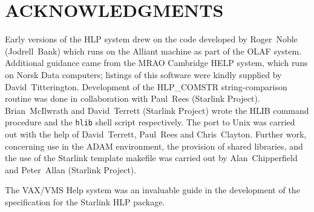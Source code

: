 \documentclass[11pt,nolof]{starlink}
\begin{document}
\section{ACKNOWLEDGMENTS}
Early versions of the HLP system drew on the code developed by
Roger~Noble (Jodrell~Bank) which runs on the Alliant machine as part of
the OLAF system.  Additional guidance came from the MRAO Cambridge HELP
system, which runs on Norsk Data computers;  listings of this software
were kindly supplied by David~Titterington.  Development of the
HLP\_COMSTR string-comparison routine was done in collaboration with
Paul~Rees (Starlink Project).  Brian~McIlwrath and David~Terrett
(Starlink Project) wrote the HLIB command procedure and the \texttt{hlib}
shell script respectively.  The port to Unix was carried out
with the help of David~Terrett, Paul~Rees and Chris~Clayton.  Further
work, concerning use in the ADAM environment, the provision
of shared libraries, and the use of the Starlink template makefile
was carried out by Alan~Chipperfield and Peter~Allan (Starlink
Project).

The VAX/VMS Help system was an invaluable guide in the development of
the specification for the Starlink HLP package.
\end{document}
